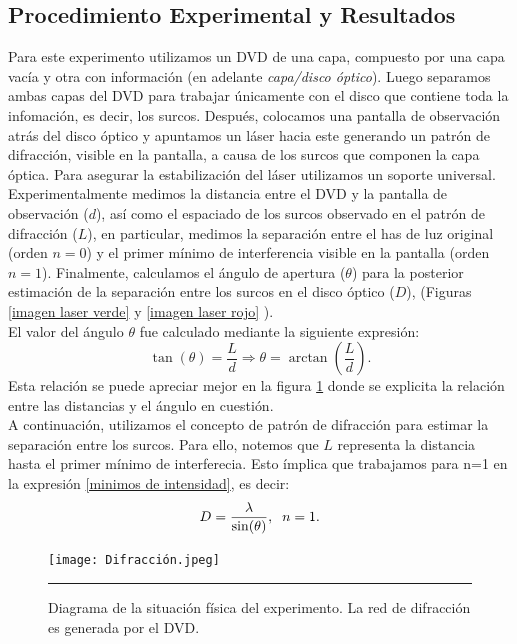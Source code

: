 \documentclass[10pt,a4paper]{article}
\begin{document}
\begin{multicols}{2}
		\section{Procedimiento Experimental y Resultados}
		Para este experimento utilizamos un DVD de una capa, compuesto por una capa vacía y otra con información (en adelante \emph{capa/disco óptico}). Luego separamos ambas capas del DVD para trabajar únicamente con el disco que contiene toda la infomación, es decir, los surcos. Después, colocamos una pantalla de observación atrás del disco óptico y apuntamos un láser hacia este generando un patrón de difracción, visible en la pantalla, a causa de los surcos que componen la capa óptica. Para asegurar la estabilización del láser utilizamos un soporte universal.\\
		
		Experimentalmente medimos la distancia entre el DVD y la pantalla de observación ($d$), así como el espaciado de los surcos observado en el patrón de difracción ($L$), en particular, medimos la separación entre el has de luz original (orden $n=0$) y el primer mínimo de interferencia visible en la pantalla (orden $n=1$). Finalmente, calculamos el ángulo de apertura ($\theta$) para la posterior estimación de la separación entre los surcos en el disco óptico ($D$), (Figuras \ref{imagen laser verde} y \ref{imagen laser rojo} ). \\
		El valor del ángulo $\theta$ fue calculado mediante la siguiente expresión:
		\begin{equation}
		\tan(\theta) = \frac{L}{d} \Longrightarrow \theta = \arctan(\frac{L}{d}).
		\end{equation}
		Esta relación se puede apreciar mejor en la figura \ref{Diagarama} donde se explicita la relación entre las distancias y el ángulo en cuestión.\\
		A continuación, utilizamos el concepto de patrón de difracción para estimar la separación entre los surcos. Para ello, notemos que $L$ representa la distancia hasta el primer mínimo de interferecia. Esto ímplica que trabajamos para n=1 en la expresión \ref{minimos de intensidad}, es decir:
		\begin{equation}
		D = \frac{\lambda}{\sin(\theta)}, \hspace{2mm} n = 1.
		\end{equation}
		\begin{figure}[H]
			\centering
			\texttt{[image: Difracción.jpeg]}
			\caption{Diagrama de la situación física del experimento. La red de difracción es generada por el DVD.}
			\label{Diagarama}
			\rule{80mm}{0.1mm}
		\end{figure}
	

\end{multicols}
\end{document}
